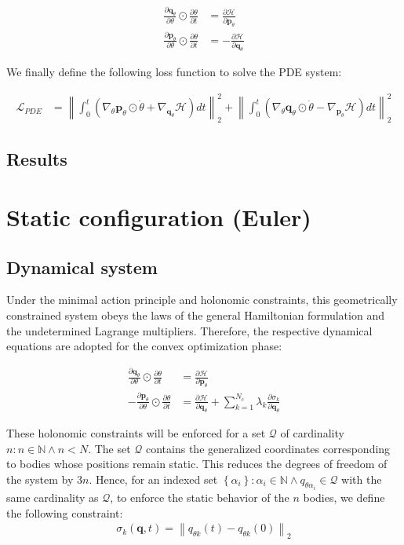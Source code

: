 \documentclass[draft]{agujournal2019}
\newcommand{\norm}[1]{\left\lVert#1\right\rVert}
\begin{document}
\begin{align*}
    \frac{\partial \mathbf{q}_\theta}{\partial \theta} \odot \frac{\partial \theta}{\partial t} &= \frac{\partial \mathcal{H}}{\partial \mathbf{p}_\theta} \\
    \frac{\partial \mathbf{p}_\theta}{\partial \theta} \odot \frac{\partial \theta}{\partial t} &= - \frac{\partial \mathcal{H}}{\partial \mathbf{q}_\theta}
\end{align*}

We finally define the following loss function to solve the PDE system:

\begin{align*}
    \mathcal{L}_{PDE} &= \norm{\int_0^t \left(\nabla_\theta \mathbf{p}_\theta \odot \dot{\theta} + \nabla_{\mathbf{q}_\theta} \mathcal{H}\right) dt}_2^2 + \norm{\int_0^t \left(\nabla_\theta \mathbf{q}_\theta \odot \dot{\theta} - \nabla_{\mathbf{p}_\theta} \mathcal{H}\right) dt}^2_2
\end{align*}

\subsection{Results}

\section{Static configuration (Euler)}
\subsection{Dynamical system}
Under the minimal action principle and holonomic constraints, this geometrically constrained system obeys the laws of the general Hamiltonian formulation and the undetermined Lagrange multipliers. Therefore, the respective dynamical equations are adopted for the convex optimization phase:

\begin{align*}
    \frac{\partial \mathbf{q}_\theta}{\partial \theta} \odot \frac{\partial \theta}{\partial t} &= \frac{\partial \mathcal{H}}{\partial \mathbf{p}_\theta} \\
    - \frac{\partial \mathbf{p}_\theta}{\partial \theta} \odot \frac{\partial \theta}{\partial t} &= \frac{\partial \mathcal{H}}{\partial \mathbf{q}_\theta} + \sum_{k = 1}^{N_c} \lambda_k \frac{\partial \sigma_k}{\partial \mathbf{q}_\theta}
\end{align*}

These holonomic constraints will be enforced for a set $\mathcal{Q}$ of cardinality $n \colon n \in \mathbb{N} \wedge n < N$. The set $\mathcal{Q}$ contains the generalized coordinates corresponding to bodies whose positions remain static. This reduces the degrees of freedom of the system by $3n$. Hence, for an indexed set $\left\{\alpha_i\right\} \colon \alpha_i \in \mathbb{N} \wedge q_{\theta\alpha_i} \in \mathcal{Q}$ with the same cardinality as $\mathcal{Q}$, to enforce the static behavior of the $n$ bodies, we define the following constraint:
\begin{align*}
    \sigma_k(\mathbf{q}, t) = \norm{q_{\theta k}(t) - q_{\theta k}(0)}_2
\end{align*}
\end{document}
